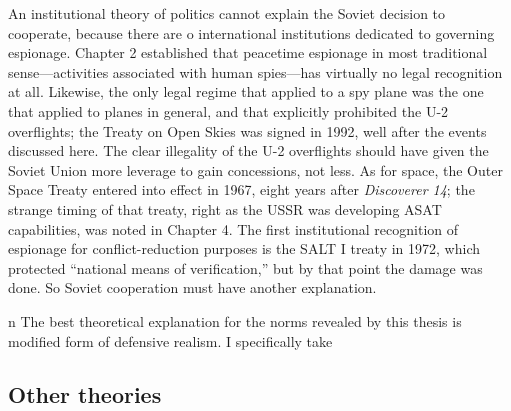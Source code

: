 \documentclass{report}
\begin{document}
An institutional theory of politics cannot explain the Soviet decision to cooperate, because there are o international institutions dedicated to governing espionage. Chapter 2 established that peacetime espionage in most traditional sense---activities associated with human spies---has virtually no legal recognition at all. Likewise, the only legal regime that applied to a spy plane was the one that applied to planes in general, and that explicitly prohibited the U-2 overflights; the Treaty on Open Skies was signed in 1992, well after the events discussed here. The clear illegality of the U-2 overflights should have given the Soviet Union more leverage to gain concessions, not less. As for space, the Outer Space Treaty entered into effect in 1967, eight years after \emph{Discoverer 14}; the strange timing of that treaty, right as the USSR was developing ASAT capabilities, was noted in Chapter 4. The first institutional recognition of espionage for conflict-reduction purposes is the SALT I treaty in 1972, which protected ``national means of verification,'' but by that point the damage was done. So Soviet cooperation must have another explanation.


n
The best theoretical explanation for the norms revealed by this thesis is 	\a modified form of defensive realism. I specifically take

\subsection{Other theories}


\end{document}
